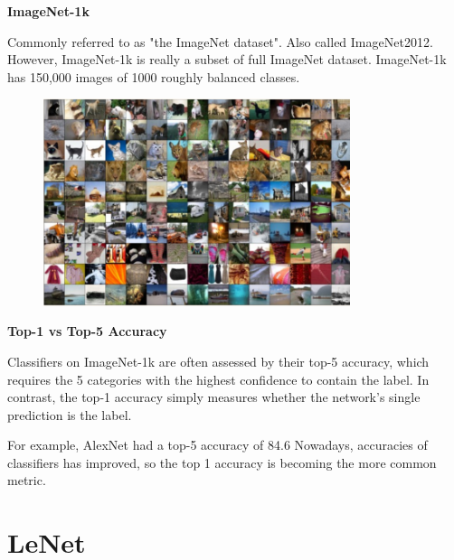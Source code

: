 \begin{definition}
    \textbf{ImageNet-1k}

    Commonly referred to as "the ImageNet dataset". Also called ImageNet2012.
    However, ImageNet-1k is really a subset of full ImageNet dataset.
    ImageNet-1k has 150,000 images of 1000 roughly balanced classes.

    \begin{figure}[H]
        \centering
        \includegraphics[width=0.8\textwidth]{.././assets/7.2.png}
    \end{figure}

    \par\noindent\textcolor{gray}{\hdashrule{\textwidth}{0.4pt}{1pt 2pt}}

    \textbf{Top-1 vs Top-5 Accuracy}

    Classifiers on ImageNet-1k are often assessed by their top-5 accuracy, which requires the 5 categories with the highest confidence to contain the label.
    In contrast, the top-1 accuracy simply measures whether the network's single prediction is the label.

    For example, AlexNet had a top-5 accuracy of 84.6%
    Nowadays, accuracies of classifiers has improved, so the top 1 accuracy is becoming the more common metric.
\end{definition}

\section{LeNet}

